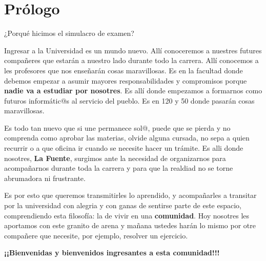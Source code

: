 \section{Prólogo}

¿Porqué hicimos el simulacro de examen?

Ingresar a la Universidad es un mundo nuevo. Allí conoceremos a nuestres futures compañeres que estarán a nuestro lado durante todo la carrera. Allí conocemos a les profesores que nos enseñarán cosas maravillosas. Es en la facultad donde debemos empezar a asumir mayores responsabilidades y compromisos porque \textbf{nadie va a estudiar por nosotres}. Es allí donde empezamos a formarnos como futuros informátic@s al servicio del pueblo. Es en 120 y 50 donde pasarán cosas maravillosas. 

Es todo tan nuevo que si une permanece sol@, puede que se pierda y no comprenda como aprobar las materias, olvide alguna cursada, no sepa a quien recurrir o a que oficina ir cuando se necesite hacer un trámite.
Es alli donde nosotres, \textbf{La Fuente}, surgimos ante la necesidad de organizarnos para acompañarnos durante toda la carrera y para que la realdiad no se torne abrumadora ni frustrante.

Es por esto que queremos transmitirles lo aprendido, y acompañarles a transitar por la universidad con alegria y con ganas de sentirse parte de este espacio, comprendiendo esta filosofía: la de vivir en una \textbf{comunidad}. Hoy nosotres les aportamos con este granito de arena y mañana ustedes harán lo mismo por otre compañere que necesite, por ejemplo, resolver un ejercicio.

\textbf{¡¡Bienvenidas y bienvenidos ingresantes a esta comunidad!!!}



